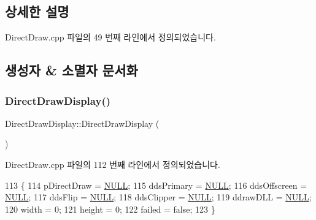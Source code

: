 \subsection{상세한 설명}


Direct\+Draw.\+cpp 파일의 49 번째 라인에서 정의되었습니다.



\subsection{생성자 \& 소멸자 문서화}
\mbox{\label{class_direct_draw_display_a09b8b740318dfadec37110b0887dd9e5}} 
\subsubsection{\texorpdfstring{Direct\+Draw\+Display()}{DirectDrawDisplay()}}
{\footnotesize\ttfamily Direct\+Draw\+Display\+::\+Direct\+Draw\+Display (\begin{DoxyParamCaption}{ }\end{DoxyParamCaption})}



Direct\+Draw.\+cpp 파일의 112 번째 라인에서 정의되었습니다.


\begin{DoxyCode}
113 \{
114   pDirectDraw = \mbox{\hyperlink{getopt1_8c_a070d2ce7b6bb7e5c05602aa8c308d0c4}{NULL}};
115   ddsPrimary = \mbox{\hyperlink{getopt1_8c_a070d2ce7b6bb7e5c05602aa8c308d0c4}{NULL}};
116   ddsOffscreen = \mbox{\hyperlink{getopt1_8c_a070d2ce7b6bb7e5c05602aa8c308d0c4}{NULL}};
117   ddsFlip = \mbox{\hyperlink{getopt1_8c_a070d2ce7b6bb7e5c05602aa8c308d0c4}{NULL}};
118   ddsClipper = \mbox{\hyperlink{getopt1_8c_a070d2ce7b6bb7e5c05602aa8c308d0c4}{NULL}};
119   ddrawDLL = \mbox{\hyperlink{getopt1_8c_a070d2ce7b6bb7e5c05602aa8c308d0c4}{NULL}};
120   width = 0;
121   height = 0;
122   failed = \textcolor{keyword}{false};
123 \}
\end{DoxyCode}
\mbox{\label{class_direct_draw_display_aa0649f887a0adb27964a13b9f1c5e059}} 
